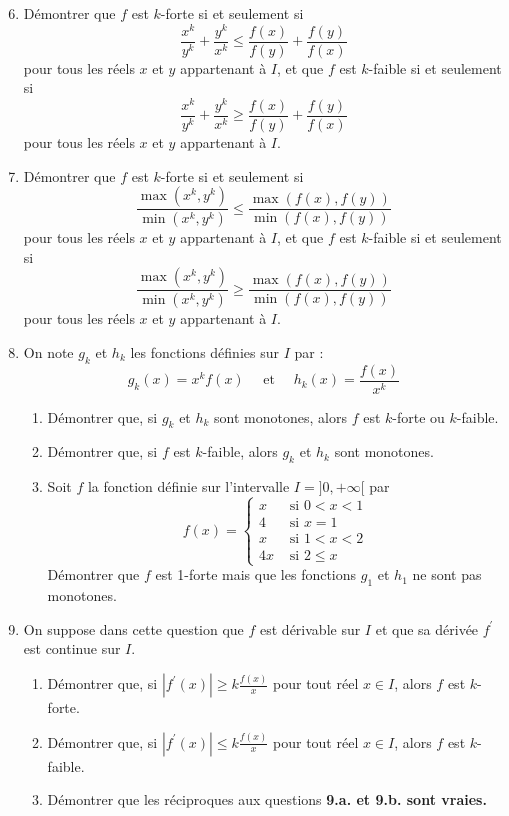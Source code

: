 \documentclass[landscape,twocolumn,leqno,a4paper,10pt]{report} %
\newcommand\q{\quad}
\renewcommand{\geq}{\geqslant}
\renewcommand{\leq}{\leqslant}
\renewcommand{\textbf}[1]{\begingroup\bfseries\mathversion{bold}#1\endgroup}		%
\begin{document}
\begin{enumerate}\setcounter{enumi}{5}
	\item Démontrer que $f$ est $k$-forte si et seulement si
	$$\frac{x^{k}}{y^{k}}+\frac{y^{k}}{x^{k}} \leq \frac{f(x)}{f(y)}+\frac{f(y)}{f(x)}$$
	pour tous les réels $x$ et $y$ appartenant à $I$, et que $f$ est $k$-faible si et seulement si
	$$\frac{x^{k}}{y^{k}}+\frac{y^{k}}{x^{k}} \geq \frac{f(x)}{f(y)}+\frac{f(y)}{f(x)}$$
	pour tous les réels $x$ et $y$ appartenant à $I$.
	\item Démontrer que $f$ est $k$-forte si et seulement si
	$$\frac{\max \left(x^{k}, y^{k}\right)}{\min \left(x^{k}, y^{k}\right)} \leq \frac{\max (f(x), f(y))}{\min (f(x), f(y))}$$
	pour tous les réels $x$ et $y$ appartenant à $I$, et que $f$ est $k$-faible si et seulement si
	$$\frac{\max \left(x^{k}, y^{k}\right)}{\min \left(x^{k}, y^{k}\right)} \geq \frac{\max (f(x), f(y))}{\min (f(x), f(y))}$$
	pour tous les réels $x$ et $y$ appartenant à $I$.
	\item On note $g_{k}$ et $h_{k}$ les fonctions définies sur $I$ par :
	$$g_{k}(x)=x^{k} f(x) \q \text { et }\q h_{k}(x)=\frac{f(x)}{x^{k}} $$
	\begin{enumerate}
		\item Démontrer que, si $g_{k}$ et $h_{k}$ sont monotones, alors $f$ est $k$-forte ou $k$-faible.
		\item Démontrer que, si $f$ est $k$-faible, alors $g_{k}$ et $h_{k}$ sont monotones.
		\item Soit $f$ la fonction définie sur l'intervalle $I=] 0,+\infty[$ par
	$$f(x)=  \left\{\begin{array}{ll} 
        x & \text { si } 0<x<1\\ 
        4 & \text { si } x=1\\
        x & \text { si } 1<x<2\\
        4x & \text { si } 2 \leq x
      \end{array}  
    \right.$$
	Démontrer que $f$ est 1-forte mais que les fonctions $g_{1}$ et $h_{1}$ ne sont pas monotones.
	\end{enumerate}
	\item On suppose dans cette question que $f$ est dérivable sur $I$ et que sa dérivée $f^{\prime}$ est continue sur $I$.
	\begin{enumerate}
		\item Démontrer que, si $\left|f^{\prime}(x)\right| \geq k \frac{f(x)}{x}$ pour tout réel $x \in I$, alors $f$ est $k$-forte.
		\item Démontrer que, si $\left|f^{\prime}(x)\right| \leq k \frac{f(x)}{x}$ pour tout réel $x \in I$, alors $f$ est $k$-faible.
		\item Démontrer que les réciproques aux questions \textbf{9.a.} et \textbf{9.b.} sont vraies.
	\end{enumerate}
\end{enumerate}
\end{document}
